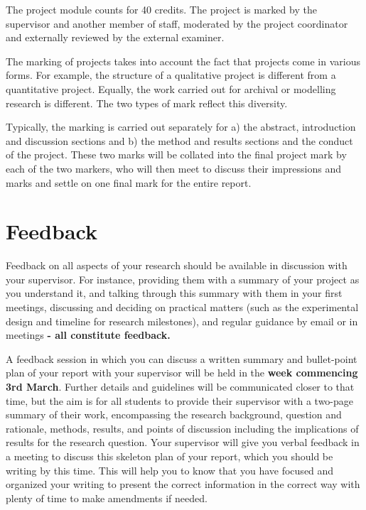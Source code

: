 \documentclass[
]{book}
\begin{document}
The project module counts for 40 credits. The project is marked by the supervisor and another member of staff, moderated by the project coordinator and externally reviewed by the external examiner.

The marking of projects takes into account the fact that projects come in various forms. For example, the structure of a qualitative project is different from a quantitative project. Equally, the work carried out for archival or modelling research is different. The two types of mark reflect this diversity.

Typically, the marking is carried out separately for a) the abstract, introduction and discussion sections and b) the method and results sections and the conduct of the project. These two marks will be collated into the final project mark by each of the two markers, who will then meet to discuss their impressions and marks and settle on one final mark for the entire report.

\section{Feedback}\label{feedback}

Feedback on all aspects of your research should be available in discussion with your supervisor. For instance, providing them with a summary of your project as you understand it, and talking through this summary with them in your first meetings, discussing and deciding on practical matters (such as the experimental design and timeline for research milestones), and regular guidance by email or in meetings \textbf{- all constitute feedback.}

A feedback session in which you can discuss a written summary and bullet-point plan of your report with your supervisor will be held in the \textbf{week commencing 3rd March}. Further details and guidelines will be communicated closer to that time, but the aim is for all students to provide their supervisor with a two-page summary of their work, encompassing the research background, question and rationale, methods, results, and points of discussion including the implications of results for the research question. Your supervisor will give you verbal feedback in a meeting to discuss this skeleton plan of your report, which you should be writing by this time. This will help you to know that you have focused and organized your writing to present the correct information in the correct way with plenty of time to make amendments if needed.
\end{document}
